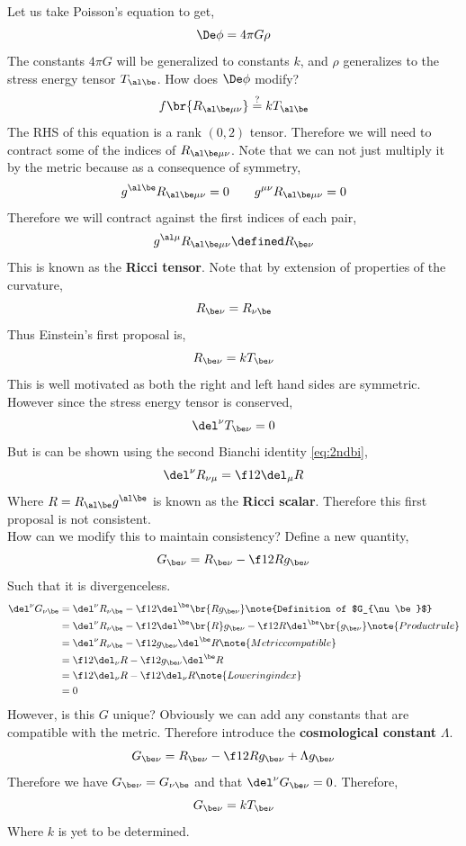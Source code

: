 \documentclass{article}
\begin{document}
Let us take Poisson's equation to get,
\[ \De \phi = 4 \pi G \rho\]
The constants $4 \pi G$ will be generalized to constants $k$, and $\rho$ generalizes to the stress energy tensor $T_{\al\be}$. How does $\De \phi$ modify?
\[ f\br{R_{\al\be\mu\nu}} \stackrel{?}{=} k T_{\al\be} \]
The RHS of this equation is a rank $(0,2)$ tensor. Therefore we will need to contract some of the indices of $R_{\al\be\mu\nu}$. Note that we can not just multiply it by the metric because as a consequence of symmetry,
\[ g^{\al\be} R_{\al\be \mu\nu} = 0 \qquad g^{\mu\nu} R_{\al\be \mu\nu} = 0 \]
Therefore we will contract against the first indices of each pair,
\[ g^{\al\mu} R_{\al\be \mu\nu} \defined R_{\be\nu}\]
This is known as the \textbf{Ricci tensor}. Note that by extension of properties of the curvature,
\[ R_{\be\nu}= R_{\nu\be} \]
Thus Einstein's first proposal is,
\[ R_{\be\nu} = k T_{\be\nu} \]
This is well motivated as both the right and left hand sides are symmetric. However since the stress energy tensor is conserved,
\[ \del^\nu T_{\be\nu} = 0 \]
But is can be shown using the second Bianchi identity \eqref{eq:2ndbi},
\[ \del^\nu R_{\nu\mu} = \f12 \del_\mu R \]
Where $R = R_{\al\be} g^{\al\be}$ is known as the \textbf{Ricci scalar}. Therefore this first proposal is not consistent.\\

How can we modify this to maintain consistency? Define a new quantity,
\[ G_{\be\nu} = R_{\be\nu} - \f12 R g_{\be\nu} \]
Such that it is divergenceless.
\begin{align*}
\del^\nu G_{\nu\be} &= \del^\nu R_{\nu\be} - \f12 \del^\be \br{R g_{\be\nu}} \note{Definition of $G_{\nu\be}$}\\
&= \del^\nu R_{\nu\be} - \f12 \del^\be \br{R }g_{\be\nu} - \f12 R\del^\be \br{ g_{\be\nu}} \note{Product rule} \\
&= \del^\nu R_{\nu\be} - \f12 g_{\be\nu} \del^\be R \note{Metric compatible} \\
&= \f12 \del_\nu R - \f12 g_{\be\nu} \del^\be R \\
&= \f12 \del_\nu R - \f12 \del_\nu R \note{Lowering index} \\
&= 0 \\
\end{align*}
However, is this $G$ unique? Obviously we can add any constants that are compatible with the metric. Therefore introduce the \textbf{cosmological constant} $\Lambda$.
\[ G_{\be\nu} = R_{\be\nu} - \f12 R g_{\be\nu}  + \Lambda g_{\be\nu}\]
Therefore we have $G_{\be\nu} = G_{\nu\be}$ and that $\del^\nu G_{\be\nu} = 0$. Therefore,
\[ G_{\be\nu} = k T_{\be\nu} \]
Where $k$ is yet to be determined.\\
\end{document}

